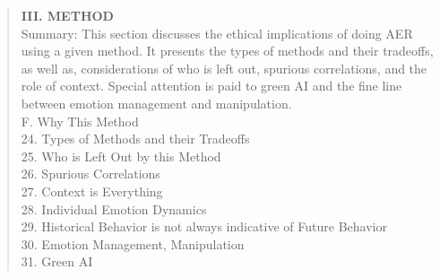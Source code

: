 \documentclass{clv3}
\begin{document}
\begin{quote}
\noindent \textbf{III. METHOD}\\[5pt]
Summary: This section discusses the ethical implications of doing AER using a given method. It presents the types of methods and their tradeoffs, as well as, considerations of who is left out, spurious correlations, and the role of context. Special attention is paid to green AI and the fine line between emotion management and manipulation.\\[5pt]
F. Why This Method\\[3pt]
\hspace*{3mm}  24. Types of Methods and their Tradeoffs\\
\hspace*{3mm}  25. Who is Left Out by this Method\\
\hspace*{3mm}  26. Spurious Correlations\\
\hspace*{3mm}  27. Context is Everything\\
\hspace*{3mm}  28. Individual Emotion Dynamics\\
\hspace*{3mm}  29. Historical Behavior is not always indicative of Future Behavior\\
\hspace*{3mm}  30. Emotion Management, Manipulation\\
\hspace*{3mm}  31. Green AI\\[3pt]
 

\end{quote}
\end{document}
